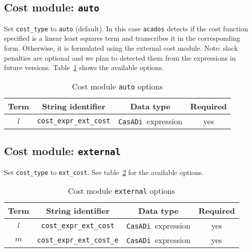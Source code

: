\documentclass[english]{article}
\newcommand{\code}[1]{\texttt{#1}}
\newcommand{\casadi}{\texttt{CasADi}}
\newcommand{\acados}{\texttt{acados}}
\newcommand{\mandatory}{yes}
\begin{document}
\subsection{Cost module: \code{auto}}\label{sec:cost:auto}
%
Set \code{cost\_type} to \code{auto} (default).
In this case \acados{} detects if the cost function specified is a linear least squares term and transcribes it in the corresponding form.
Otherwise, it is formulated using the external cost module.
Note: slack penalties are optional and we plan to detected them from the expressions in future versions.
Table~\ref{tab:cost:auto} shows the available options.
%
\begin{table}[ht!]
    \centering
    \caption{Cost module \code{auto} options} \label{tab:cost:auto}
    \begin{tabular}{cccc}
        \toprule
        Term & String identifier & Data type & Required \\ \midrule
        $ l $ & \code{cost\_expr\_ext\_cost}    & \casadi~expression   & \mandatory  \\ 
        \bottomrule
    \end{tabular}
\end{table}
%
\subsection{Cost module: \code{external}}\label{sec:cost:external}
%
Set \code{cost\_type} to \code{ext\_cost}. %
See table~\ref{tab:cost:external} for the available options.
\begin{table}[ht!]
    \centering
    \caption{Cost module \code{external} options} \label{tab:cost:external}
    \begin{tabular}{cccc}
        \toprule
        Term & String identifier & Data type & Required \\ \midrule
        $ l $ & \code{cost\_expr\_ext\_cost}    & \casadi~expression   & \mandatory  \\
        $ m $ & \code{cost\_expr\_ext\_cost\_e}    & \casadi~expression  & \mandatory \\
        \bottomrule
    \end{tabular}
\end{table}
%
\end{document}
